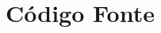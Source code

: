 \documentclass[]{lapesd-thesis}
\begin{document}

\pretextual%

\textual%

\postextual




\chapter{Código Fonte}
\end{document}
